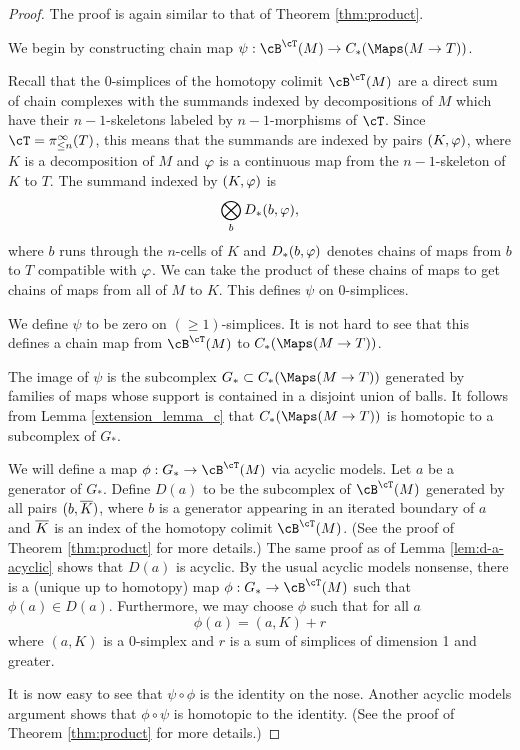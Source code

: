 \begin{proof}
The proof is again similar to that of Theorem \ref{thm:product}.

We begin by constructing chain map $\psi: \cB^\cT(M) \to C_*(\Maps(M\to T))$.

Recall that 
the 0-simplices of the homotopy colimit $\cB^\cT(M)$ 
are a direct sum of chain complexes with the summands indexed by
decompositions of $M$ which have their $n{-}1$-skeletons labeled by $n{-}1$-morphisms
of $\cT$.
Since $\cT = \pi^\infty_{\leq n}(T)$, this means that the summands are indexed by pairs
$(K, \varphi)$, where $K$ is a decomposition of $M$ and $\varphi$ is a continuous
map from the $n{-}1$-skeleton of $K$ to $T$.
The summand indexed by $(K, \varphi)$ is
\[
	\bigotimes_b D_*(b, \varphi),
\]
where $b$ runs through the $n$-cells of $K$ and $D_*(b, \varphi)$ denotes
chains of maps from $b$ to $T$ compatible with $\varphi$.
We can take the product of these chains of maps to get chains of maps from
all of $M$ to $K$.
This defines $\psi$ on 0-simplices.

We define $\psi$ to be zero on $(\ge1)$-simplices.
It is not hard to see that this defines a chain map from 
$\cB^\cT(M)$ to $C_*(\Maps(M\to T))$.

The image of $\psi$ is the subcomplex $G_*\sub C_*(\Maps(M\to T))$ generated by 
families of maps whose support is contained in a disjoint union of balls.
It follows from Lemma \ref{extension_lemma_c} 
that $C_*(\Maps(M\to T))$ is homotopic to a subcomplex of $G_*$.

We will define a map $\phi:G_*\to \cB^\cT(M)$ via acyclic models.
Let $a$ be a generator of $G_*$.
Define $D(a)$ to be the subcomplex of $\cB^\cT(M)$ generated by all 
pairs $(b, \overline{K})$, where $b$ is a generator appearing in an iterated boundary of $a$
and $\overline{K}$ is an index of the homotopy colimit $\cB^\cT(M)$.
(See the proof of Theorem \ref{thm:product} for more details.)
The same proof as of Lemma \ref{lem:d-a-acyclic} shows that $D(a)$ is acyclic.
By the usual acyclic models nonsense, there is a (unique up to homotopy)
map $\phi:G_*\to \cB^\cT(M)$ such that $\phi(a)\in D(a)$.
Furthermore, we may choose $\phi$ such that for all $a$ 
\[
	\phi(a) = (a, K) + r
\]
where $(a, K)$ is a 0-simplex and $r$ is a sum of simplices of dimension 1 and greater.

It is now easy to see that $\psi\circ\phi$ is the identity on the nose.
Another acyclic models argument shows that $\phi\circ\psi$ is homotopic to the identity.
(See the proof of Theorem \ref{thm:product} for more details.)
\end{proof}